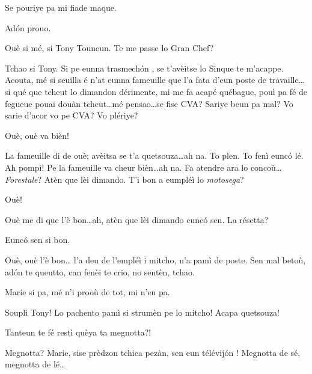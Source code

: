 \begin{drama}
\Mariespeaks Se pouriye pa mi fiade maque.

\Turispeaks Ad\'on prouo.



\Turispeaks{} Ouè si mé, si Tony Touneun. Te me passe lo Gran Chef? 


\Turispeaks{} Tchao si Tony. Si pe eunna trasmech\'on , se t'avèitse lo Sinque te m'acappe. Acouta, mé si seuilla é n'at eunna fameuille que l'a fata d'eun poste de travaille\ldots si qué que tcheut lo dimandon dérimente, mi me fa acapé québague, pouì pa fé de fegueue pouai douàn tcheut\ldots mé pensao\ldots se fise CVA? Sariye beun pa mal?  Vo sarie d'acor vo pe CVA? Vo plériye?


\Tanteunspeaks Ouè, ouè va bièn!

\Turispeaks{} La fameuille di de ouè; avèitsa se t'a quetsouza\ldots ah na. To plen. To fenì eunc\'o lé. Ah pompì! Pe la fameuille va cheur bièn\ldots ah na. Fa atendre ara lo concoù\ldots \textit{Forestale}? Atèn que lèi dimando.  T'i bon a eumpléì lo \textit{motosega}?

\Twitterspeaks{} Ouè!

\Turispeaks{} Ouè me di que l'è bon\ldots ah, atèn que lèi dimando eunc\'o sen.  La résetta?

\Twitterspeaks{} Eunc\'o sen si bon.

\Turispeaks{} Ouè, ouè l'è bon\ldots {} l'a deu de l'empléì i mitcho, n'a pamì de poste.  Sen mal betoù, ad\'on te queutto, can fenèi te crio, no sentèn, tchao.


\Turispeaks Marie si pa, mé n'i prooù de tot, mi n'en pa.

\Ipadspeaks Souplì Tony! Lo pachento pamì si strumèn pe lo mitcho! Acapa quetsouza!

\Alicespeaks{} Tanteun te fé restì quèya ta megnotta?!

\Turispeaks Megnotta? Marie, sise prèdzon tchica pezàn, sen eun télévij\'on ! Megnotta de sé, megnotta de lé\ldots


\end{drama}
